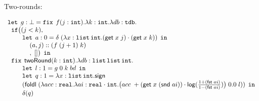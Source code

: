 \newpage
\begin{figure}
\small
Two-rounds:

\[
\begin{array}{l}
  \mathop{\mathtt{let}} \;  g: \bot = 
  \mathop{\mathtt{fix}} \; f(j: \mathtt{int}). \lambda k: \mathtt{int}. \lambda db: \mathtt{tdb}.\\
  \hspace{.2cm}  \mathtt{if} \big (  (j < k)  ,  \\
  \hspace{.8cm}  \mathop{\mathtt{let}} \;  a: 0 = 
                 \delta \;  
                 (\lambda x: \mathtt{list} \, \mathtt{int}. 
                 (\mathsf{get} \; x \; j) \cdot (\mathsf{get} \; x \; k) ) 
                  \; \mathop{ \mathtt{in}} \\
  \hspace{1.2cm} (a, j) :: (f  \; (j+1) \;  k) \\
  \hspace{1.2cm} ,\;  [] \big) \; \mathop{ \mathtt{in}}\\
  \hspace{.2cm}  \mathop{\mathtt{fix}} \; \mathsf{twoRound}(k : \mathtt{int}). 
                 \lambda db:\mathtt{list} \, \mathtt{list} \, \mathtt{int}.\\
  \hspace{.8cm}  \mathop{\mathtt{let}} \;  l: 1 = g \;  0 \;  k \; bd \;  \mathop{ \mathtt{in}} \\
  \hspace{.8cm}  \mathop{\mathtt{let}} \;  q: 1 =  \lambda x: \mathtt{list} \, \mathtt{int}. \mathsf{sign} \; \\ 
  \hspace{.8cm}  (\mathsf{foldl} \;  (\lambda acc: \mathtt{real}. 
                 \lambda ai: \mathtt{real} \cdot \mathtt{int}. 
                 \big(acc\; + (\mathsf{get} \; x \;  (\mathsf{snd} \; ai)) 
                 \cdot \mathsf{log}(\frac{1+ (\mathsf{fst} \; ai) }{1 - (\mathsf{fst} \; ai)}) \big)
                 \;  0.0 \;  l )) \;  \mathop{ \mathtt{in}} \\
  \hspace{.8cm}  \delta ( q )
\end{array}
\]
\end{figure}


